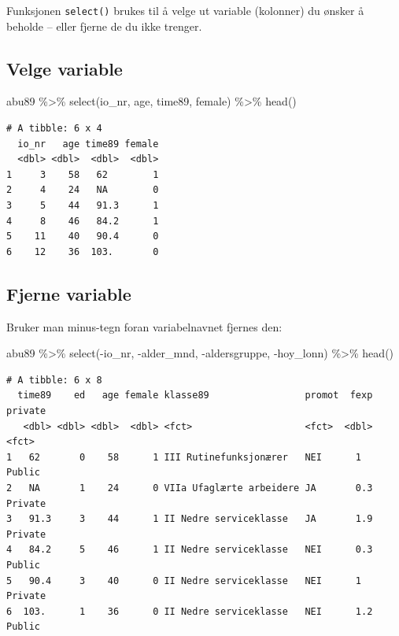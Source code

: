 \documentclass[
  norsk,
  letterpaper,
  DIV=11,
  numbers=noendperiod]{scrreprt}
\newenvironment{Shaded}{\begin{snugshade}}{\end{snugshade}}
\newcommand{\FunctionTok}[1]{\textcolor[rgb]{0.28,0.35,0.67}{#1}}
\newcommand{\NormalTok}[1]{\textcolor[rgb]{0.00,0.23,0.31}{#1}}
\newcommand{\SpecialCharTok}[1]{\textcolor[rgb]{0.37,0.37,0.37}{#1}}
\theoremstyle{definition}
\theoremstyle{remark}
\begin{document}
Funksjonen \texttt{select()} brukes til å velge ut variable (kolonner)
du ønsker å beholde -- eller fjerne de du ikke trenger.

\subsection{Velge variable}\label{velge-variable}

\begin{Shaded}
\begin{Highlighting}[]
\NormalTok{abu89 }\SpecialCharTok{\%\textgreater{}\%}
  \FunctionTok{select}\NormalTok{(io\_nr, age, time89, female) }\SpecialCharTok{\%\textgreater{}\%}
  \FunctionTok{head}\NormalTok{()}
\end{Highlighting}
\end{Shaded}

\begin{verbatim}
# A tibble: 6 x 4
  io_nr   age time89 female
  <dbl> <dbl>  <dbl>  <dbl>
1     3    58   62        1
2     4    24   NA        0
3     5    44   91.3      1
4     8    46   84.2      1
5    11    40   90.4      0
6    12    36  103.       0
\end{verbatim}

\subsection{Fjerne variable}\label{fjerne-variable}

Bruker man minus-tegn foran variabelnavnet fjernes den:

\begin{Shaded}
\begin{Highlighting}[]
\NormalTok{abu89 }\SpecialCharTok{\%\textgreater{}\%}
  \FunctionTok{select}\NormalTok{(}\SpecialCharTok{{-}}\NormalTok{io\_nr, }\SpecialCharTok{{-}}\NormalTok{alder\_mnd, }\SpecialCharTok{{-}}\NormalTok{aldersgruppe, }\SpecialCharTok{{-}}\NormalTok{hoy\_lonn) }\SpecialCharTok{\%\textgreater{}\%}
  \FunctionTok{head}\NormalTok{()}
\end{Highlighting}
\end{Shaded}

\begin{verbatim}
# A tibble: 6 x 8
  time89    ed   age female klasse89                 promot  fexp private
   <dbl> <dbl> <dbl>  <dbl> <fct>                    <fct>  <dbl> <fct>  
1   62       0    58      1 III Rutinefunksjonærer   NEI      1   Public 
2   NA       1    24      0 VIIa Ufaglærte arbeidere JA       0.3 Private
3   91.3     3    44      1 II Nedre serviceklasse   JA       1.9 Private
4   84.2     5    46      1 II Nedre serviceklasse   NEI      0.3 Public 
5   90.4     3    40      0 II Nedre serviceklasse   NEI      1   Private
6  103.      1    36      0 II Nedre serviceklasse   NEI      1.2 Public 
\end{verbatim}
\end{document}
